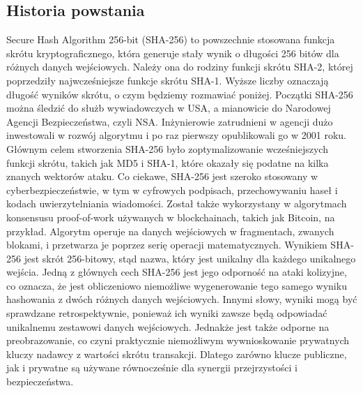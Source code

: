 \documentclass[12pt, a4paper]{article}
\begin{document}
\subsection{Historia powstania}
Secure Hash Algorithm 256-bit (SHA-256) to powszechnie stosowana funkcja skrótu kryptograficznego, która generuje stały wynik o długości 256 bitów dla różnych danych wejściowych. Należy ona do rodziny funkcji skrótu SHA-2, której poprzedziły najwcześniejsze funkcje skrótu SHA-1. Wyższe liczby oznaczają długość wyników skrótu, o czym będziemy rozmawiać poniżej.
Początki SHA-256 można śledzić do służb wywiadowczych w USA, a mianowicie do Narodowej Agencji Bezpieczeństwa, czyli NSA. Inżynierowie zatrudnieni w agencji dużo inwestowali w rozwój algorytmu i po raz pierwszy opublikowali go w 2001 roku. Głównym celem stworzenia SHA-256 było zoptymalizowanie wcześniejszych funkcji skrótu, takich jak MD5 i SHA-1, które okazały się podatne na kilka znanych wektorów ataku.
Co ciekawe, SHA-256 jest szeroko stosowany w cyberbezpieczeństwie, w tym w cyfrowych podpisach, przechowywaniu haseł i kodach uwierzytelniania wiadomości. Został także wykorzystany w algorytmach konsensusu proof-of-work używanych w blockchainach, takich jak Bitcoin, na przykład.
Algorytm operuje na danych wejściowych w fragmentach, zwanych blokami, i przetwarza je poprzez serię operacji matematycznych. Wynikiem SHA-256 jest skrót 256-bitowy, stąd nazwa, który jest unikalny dla każdego unikalnego wejścia.
Jedną z głównych cech SHA-256 jest jego odporność na ataki kolizyjne, co oznacza, że jest obliczeniowo niemożliwe wygenerowanie tego samego wyniku hashowania z dwóch różnych danych wejściowych. Innymi słowy, wyniki mogą być sprawdzane retrospektywnie, ponieważ ich wyniki zawsze będą odpowiadać unikalnemu zestawowi danych wejściowych.
Jednakże jest także odporne na preobrazowanie, co czyni praktycznie niemożliwym wywnioskowanie prywatnych kluczy nadawcy z wartości skrótu transakcji. Dlatego zarówno klucze publiczne, jak i prywatne są używane równocześnie dla synergii przejrzystości i bezpieczeństwa.
\end{document}
